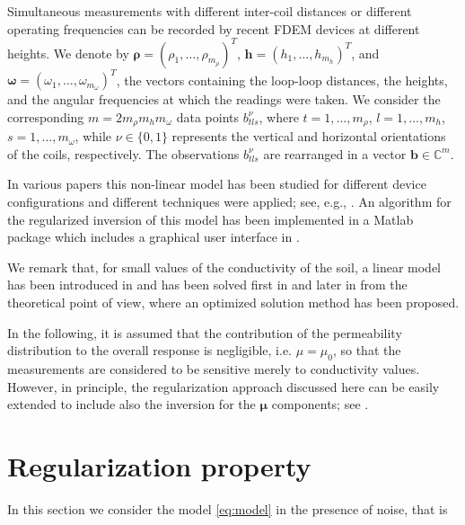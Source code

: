 \documentclass[final,leqno]{siamltex}
\newcommand{\omegab}{\boldsymbol{\omega}}
\newcommand{\mub}{\boldsymbol{\mu}}
\newcommand{\rhob}{\boldsymbol{\rho}}
\newcommand{\C}{{\mathbb{C}}}
\begin{document}
Simultaneous measurements with different inter-coil distances or different operating frequencies can be recorded by recent FDEM devices at different heights.
We denote by $\rhob=(\rho_1,\ldots,\rho_{m_\rho})^T$, $\mathbf{h}=(h_1,\ldots,h_{m_h})^T$, and $\omegab=(\omega_1,\ldots,\omega_{m_\omega})^T$, the vectors containing the
loop-loop distances, the heights, and the angular frequencies at which the readings were taken. We consider the corresponding $m=2 m_\rho m_h m_\omega$ data points $b^\nu_{tls}$, where $t=1,\ldots,m_\rho$, $l=1,\ldots,m_h$, $s=1,\ldots,m_\omega$, while $\nu\in\{0, 1\}$ represents the vertical and horizontal orientations of the coils, respectively.
The observations $b^\nu_{tls}$ are rearranged in a vector $\mathbf{b}\in\C^m$.

In various papers this non-linear model has been studied for different device configurations and different techniques were applied; see, e.g., \cite{hendr02,dfr14,dr16,ddr17,ddrv18,ddrv19}. An algorithm for the regularized inversion of this model has been implemented in a Matlab package which includes a graphical user interface in \cite{ddflr20}.

We remark that, for small values of the conductivity of the soil, a linear model has been introduced in \cite{McNeill} and has been solved first in \cite{Borchers} and later in \cite{dfrv19} from the theoretical point of view, where an optimized solution method has been proposed.

In the following, it is assumed that the contribution of the permeability
distribution to the overall response is negligible, i.e. $\mu=\mu_0$, so that the measurements are considered to be sensitive merely to conductivity values. However, in principle, the regularization approach discussed here can be easily extended
to include also the inversion for the $\mub$ components; see \cite{ddr17}.
\section{Regularization property}\label{sect:reg}
In this section we consider the model \eqref{eq:model} in the presence of noise, that is
\end{document}
